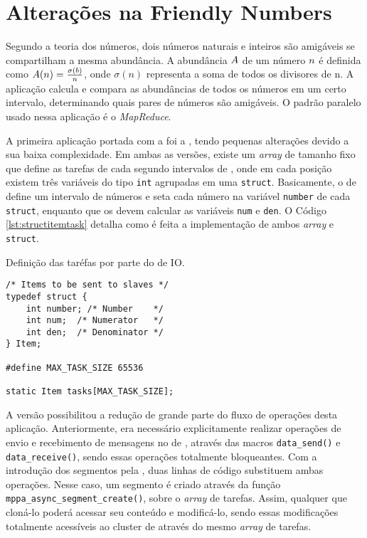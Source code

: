 \section{Alterações na Friendly Numbers}
\label{sec:alteracoesfn}

Segundo a teoria dos números, dois números naturais e inteiros são amigáveis se compartilham a mesma abundância. A abundância $\mathnormal{A}$ de um número $\mathnormal{n}$ é definida como $\mathnormal{A(n) = \frac{\sigma(b)}{n}}$, onde $\sigma(n)$ representa a soma de todos os divisores de n. A aplicação \textit{\FN} calcula e compara as abundâncias de todos os números em um certo intervalo, determinando quais pares de números são amigáveis. O padrão paralelo usado nessa aplicação é o \textit{MapReduce}.

A primeira aplicação portada com a \ASYNC foi a \textit{\FN}, tendo pequenas alterações devido a sua baixa complexidade. Em ambas as versões, existe um \textit{array} de tamanho fixo que define as tarefas de cada \cluster segundo intervalos de \offsets, onde em cada posição existem três variáveis do tipo \texttt{int} agrupadas em uma \texttt{struct}. Basicamente, o \cluster de \IO define um intervalo de números e seta cada número na variável \texttt{number} de cada \texttt{struct}, enquanto que os \CCs devem calcular as variáveis \texttt{num} e \texttt{den}. O Código \ref{lst:structitemtask} detalha como é feita a implementação de ambos \textit{array} e \texttt{struct}.

\begin{listing}[h]
\caption{Definição das taréfas por  parte do \cluster de IO.}
\label{lst:structitemtask}
\begin{verbatim}
/* Items to be sent to slaves */
typedef struct {
    int number; /* Number    */
    int num;  /* Numerator   */
    int den;  /* Denominator */
} Item;    

#define MAX_TASK_SIZE 65536

static Item tasks[MAX_TASK_SIZE];
\end{verbatim}
\end{listing}

A versão \ASYNC possibilitou a redução de grande parte do fluxo de operações desta aplicação. Anteriormente, era necessário explicitamente realizar operações de envio e recebimento de mensagens no \cluster de \IO, através das macros \texttt{data\_send()} e \texttt{data\_receive()}, sendo essas operações totalmente bloqueantes. Com a introdução dos segmentos pela \API \ASYNC, duas linhas de código substituem ambas operações. Nesse caso, um segmento é criado através da função \texttt{mppa\_async\_segment\_create()}, sobre o \textit{array} de tarefas. Assim, qualquer \CC que cloná-lo poderá acessar seu conteúdo e modificá-lo, sendo essas modificações totalmente acessíveis ao cluster de \IO através do mesmo \textit{array} de tarefas.

